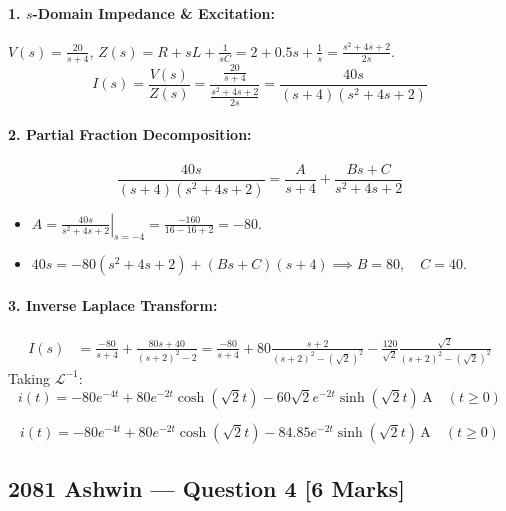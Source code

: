 \documentclass[11pt,a4paper,oneside]{article}
\begin{document}
\paragraph{1. $s$-Domain Impedance \& Excitation:}
$V(s) = \frac{20}{s+4}$, \quad $Z(s) = R + sL + \frac{1}{sC} = 2 + 0.5s + \frac{1}{s} = \frac{s^2 + 4s + 2}{2s}$.
\begin{equation}
  I(s) = \frac{V(s)}{Z(s)} = \frac{\frac{20}{s+4}}{\frac{s^2 + 4s + 2}{2s}} = \frac{40s}{(s+4)(s^2 + 4s + 2)}
\end{equation}
\paragraph{2. Partial Fraction Decomposition:}
\[
\frac{40s}{(s+4)(s^2 + 4s + 2)} = \frac{A}{s+4} + \frac{Bs + C}{s^2 + 4s + 2}
\]
\begin{itemize}[leftmargin=1.5em]
  \item $A = \left.\frac{40s}{s^2 + 4s + 2}\right|_{s=-4} = \frac{-160}{16 - 16 + 2} = -80$.
  \item $40s = -80(s^2 + 4s + 2) + (Bs + C)(s + 4) \implies B = 80, \quad C = 40$.
\end{itemize}
\paragraph{3. Inverse Laplace Transform:}
\begin{align*}
  I(s) &= \frac{-80}{s+4} + \frac{80s + 40}{(s+2)^2 - 2} = \frac{-80}{s+4} + 80 \frac{s+2}{(s+2)^2 - (\sqrt{2})^2} - \frac{120}{\sqrt{2}} \frac{\sqrt{2}}{(s+2)^2 - (\sqrt{2})^2}
\end{align*}
Taking $\mathcal{L}^{-1}$:
\begin{equation}
  i(t) = -80 e^{-4t} + 80 e^{-2t}\cosh(\sqrt{2}t) - 60\sqrt{2} e^{-2t}\sinh(\sqrt{2}t)\,\mathrm{A} \quad (t \ge 0)
\end{equation}

\begin{answerbox}
\[
i(t) = -80 e^{-4t} + 80 e^{-2t}\cosh(\sqrt{2}t) - 84.85 e^{-2t}\sinh(\sqrt{2}t)\,\mathrm{A} \quad (t \ge 0)
\]
\end{answerbox}

\newpage

\subsection{2081 Ashwin --- Question 4 [6 Marks]}
\end{document}
